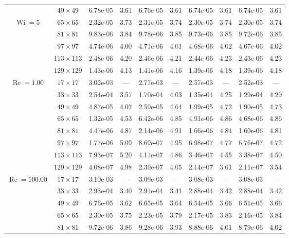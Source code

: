 \documentclass[preprint, 12pt]{elsarticle}
\begin{document}
\begin{center}
\begin{table}[H]
{\begin{tabular*}{\textwidth}{@{\extracolsep\fill}cccccccccc@{}}
& $49\times 49$ & 6.78e-05 & 3.61 & 6.76e-05 & 3.61 & 6.74e-05 & 3.61 & 6.74e-05 & 3.61 \\
\multirow{3}{*}{$\operatorname{Wi}=5$} & $65\times 65$ & 2.32e-05 & 3.73 & 2.31e-05 & 3.74 & 2.30e-05 & 3.74 & 2.30e-05 & 3.74 \\
& $81\times 81$ & 9.83e-06 & 3.84 & 9.78e-06 & 3.85 & 9.73e-06 & 3.85 & 9.72e-06 & 3.85 \\
& $97\times 97$ & 4.74e-06 & 4.00 & 4.71e-06 & 4.01 & 4.68e-06 & 4.02 & 4.67e-06 & 4.02 \\
& $113\times 113$ & 2.48e-06 & 4.20 & 2.46e-06 & 4.21 & 2.44e-06 & 4.23 & 2.43e-06 & 4.23 \\
& $129\times 129$ & 1.43e-06 & 4.13 & 1.41e-06 & 4.16 & 1.39e-06 & 4.18 & 1.39e-06 & 4.18 \\
    \hline\hline
    \multirow{7}{*}{$\operatorname{Re}=1.00$} & $17\times 17$ & 3.02e-03 & --- & 2.77e-03 & --- & 2.57e-03 & --- & 2.52e-03 & --- \\
& $33\times 33$ & 2.54e-04 & 3.57 & 1.70e-04 & 4.03 & 1.35e-04 & 4.25 & 1.29e-04 & 4.29 \\
& $49\times 49$ & 4.87e-05 & 4.07 & 2.59e-05 & 4.64 & 1.99e-05 & 4.72 & 1.90e-05 & 4.73 \\
\multirow{3}{*}{$\operatorname{Wi}=10$} & $65\times 65$ & 1.32e-05 & 4.53 & 6.42e-06 & 4.85 & 4.91e-06 & 4.86 & 4.68e-06 & 4.86 \\
& $81\times 81$ & 4.47e-06 & 4.87 & 2.14e-06 & 4.91 & 1.66e-06 & 4.84 & 1.60e-06 & 4.81 \\
& $97\times 97$ & 1.77e-06 & 5.09 & 8.69e-07 & 4.95 & 6.98e-07 & 4.77 & 6.76e-07 & 4.72 \\
& $113\times 113$ & 7.93e-07 & 5.20 & 4.11e-07 & 4.86 & 3.46e-07 & 4.55 & 3.38e-07 & 4.50 \\
& $129\times 129$ & 4.08e-07 & 4.98 & 2.39e-07 & 4.05 & 2.14e-07 & 3.61 & 2.11e-07 & 3.54 \\
    \hline
    \multirow{7}{*}{$\operatorname{Re}=100.00$} & $17\times 17$ & 3.10e-03 & --- & 3.09e-03 & --- & 3.08e-03 & --- & 3.08e-03 & --- \\
& $33\times 33$ & 2.93e-04 & 3.40 & 2.91e-04 & 3.41 & 2.88e-04 & 3.42 & 2.88e-04 & 3.42 \\
& $49\times 49$ & 6.76e-05 & 3.62 & 6.65e-05 & 3.64 & 6.54e-05 & 3.66 & 6.51e-05 & 3.66 \\
\multirow{3}{*}{$\operatorname{Wi}=10$} & $65\times 65$ & 2.30e-05 & 3.75 & 2.23e-05 & 3.79 & 2.17e-05 & 3.83 & 2.16e-05 & 3.84 \\
& $81\times 81$ & 9.72e-06 & 3.86 & 9.28e-06 & 3.93 & 8.88e-06 & 4.01 & 8.79e-06 & 4.02 \\

\end{tabular*}}
\end{table}
\end{center}
\end{document}
